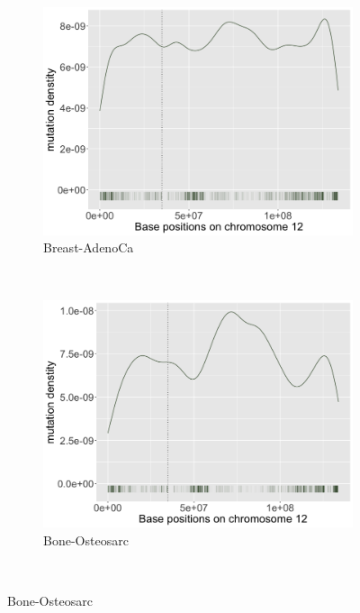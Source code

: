 \begin{figure}[h!]
    \begin{subfigure}{.5\textwidth}
    \includegraphics[width=\linewidth,height=0.6\textwidth]{graphics/mutdistribution_Breast-AdenoCa.png}
    \caption{Breast-AdenoCa}
    \end{subfigure}
    ~
    \begin{subfigure}{.5\textwidth}
    \includegraphics[width=\linewidth,height=0.6\textwidth]{graphics/mutdistribution_Bone-Osteosarc.png}
    \caption{Bone-Osteosarc}
    \end{subfigure} \\
    \vspace{0.2cm}
    

\end{figure}
